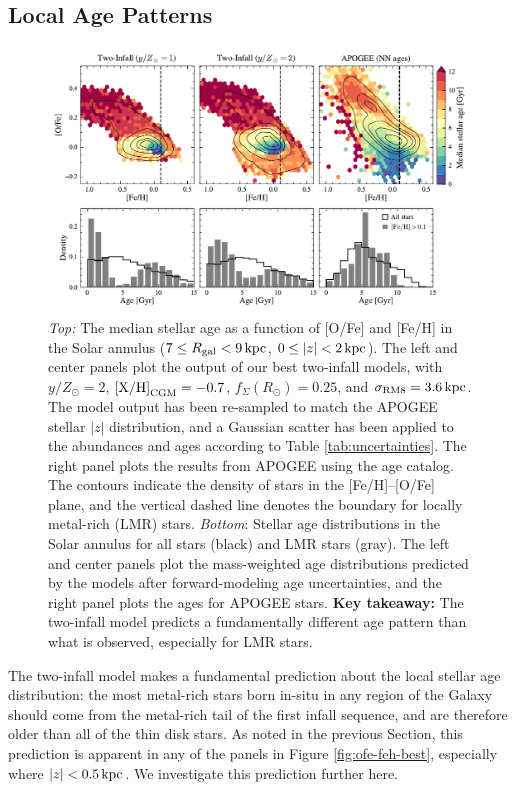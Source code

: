 \documentclass[twocolumn,twocolappendix,linenumbers]{aastex631}
\newcommand{\yZ}[1]{$y/Z_\odot=#1$}
\newcommand{\kpc}{\,{\rm kpc}}
\begin{document}
\subsection{Local Age Patterns}

\begin{figure}
    \centering
    \includegraphics[width=\textwidth]{figures/lmr_ages.pdf}
    \caption{{\it Top:} The median stellar age as a function of [O/Fe] and [Fe/H] in the Solar annulus ($7\leq R_{\rm gal}<9\kpc$, $0\leq|z|<2\kpc$). The left and center panels plot the output of our best two-infall models, with \yZ{2}, ${\rm [X/H]}_{\rm CGM}=-0.7$, $f_\Sigma(R_\odot)=0.25$, and $\sigma_{\rm RM8}=3.6\kpc$. The model output has been re-sampled to match the APOGEE stellar $|z|$ distribution, and a Gaussian scatter has been applied to the abundances and ages according to Table \ref{tab:uncertainties}. The right panel plots the results from APOGEE using the \citet{leung_variational_2023} age catalog. The contours indicate the density of stars in the [Fe/H]--[O/Fe] plane, and the vertical dashed line denotes the boundary for locally metal-rich (LMR) stars.
    {\it Bottom}: Stellar age distributions in the Solar annulus for all stars (black) and LMR stars (gray). The left and center panels plot the mass-weighted age distributions predicted by the models after forward-modeling age uncertainties, and the right panel plots the \citet{leung_variational_2023} ages for APOGEE stars.
    {\bf Key takeaway:} The two-infall model predicts a fundamentally different age pattern than what is observed, especially for LMR stars.}
    \label{fig:lmr-ages}
\end{figure}

The two-infall model makes a fundamental prediction about the local stellar age distribution: the most metal-rich stars born in-situ in any region of the Galaxy should come from the metal-rich tail of the first infall sequence, and are therefore older than all of the thin disk stars. As noted in the previous Section, this prediction is apparent in any of the panels in Figure \ref{fig:ofe-feh-best}, especially where $|z|<0.5\kpc$. We investigate this prediction further here.
\end{document}
